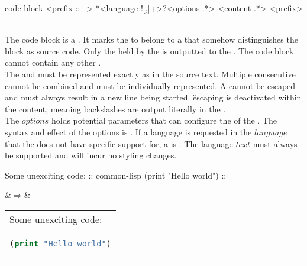 \begin{identifier}{code-block}
<prefix ::+> *<language ![,]+>?<options .*>
<content .*>
<prefix>
\end{identifier}
 \\

The code block is a . It marks the  to belong to a  that somehow distinguishes the block as source code. Only the  held by the  is outputted to the . The code block  cannot contain any other . \\

The  and  must be represented exactly as in the source text. Multiple consecutive   cannot be combined and must be individually represented. A   cannot be escaped and must always result in a new line being started. \G{escaping} is deactivated within the content, meaning backslashes are output literally in the .  \\

The \inline$options$  holds potential parameters that can configure the  of the . The syntax and effect of the options is . If a language is requested in the \inline$language$  that the  does not have specific support for, a  is . The language \inline$text$ must always be supported and will incur no styling changes. \\

\begin{examples}
\begin{examplesource}
Some unexciting code:
:: common-lisp
(print "Hello world")
::
\end{examplesource}
  &$\Rightarrow$&
  \begin{tabular}{@{}l@{}}
Some unexciting code: \\
\begin{lstlisting}[style=codestyle,language=Lisp,showstringspaces=false]
(print "Hello world")
\end{lstlisting}
\end{tabular}
\end{examples}

